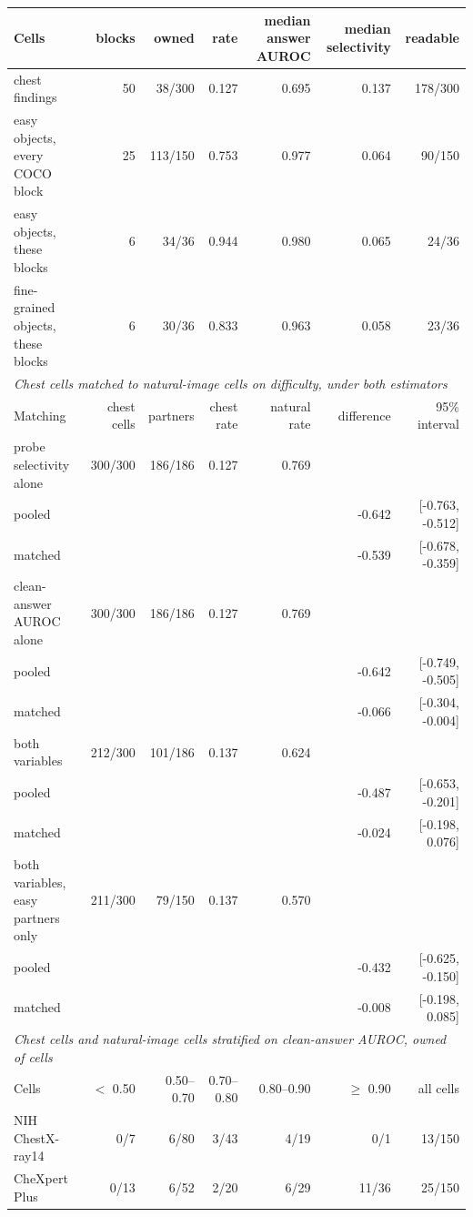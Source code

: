 \documentclass{article}
\begin{document}
\begin{table}[htbp]
\begin{tabular}{lrrrrrr}
Cells & blocks & owned & rate & median answer AUROC & median selectivity & readable \\
\midrule
chest findings & 50 & 38/300 & 0.127 & 0.695 & 0.137 & 178/300 \\
easy objects, every COCO block & 25 & 113/150 & 0.753 & 0.977 & 0.064 & 90/150 \\
easy objects, these blocks & 6 & 34/36 & 0.944 & 0.980 & 0.065 & 24/36 \\
fine-grained objects, these blocks & 6 & 30/36 & 0.833 & 0.963 & 0.058 & 23/36 \\
\midrule
\multicolumn{7}{l}{\textit{Chest cells matched to natural-image cells on difficulty, under both estimators}} \\
Matching & chest cells & partners & chest rate & natural rate & difference & 95\% interval \\
\midrule
probe selectivity alone & 300/300 & 186/186 & 0.127 & 0.769 &  &  \\
\quad pooled &  &  &  &  & -0.642 & [-0.763, -0.512] \\
\quad matched &  &  &  &  & -0.539 & [-0.678, -0.359] \\
clean-answer AUROC alone & 300/300 & 186/186 & 0.127 & 0.769 &  &  \\
\quad pooled &  &  &  &  & -0.642 & [-0.749, -0.505] \\
\quad matched &  &  &  &  & -0.066 & [-0.304, -0.004] \\
both variables & 212/300 & 101/186 & 0.137 & 0.624 &  &  \\
\quad pooled &  &  &  &  & -0.487 & [-0.653, -0.201] \\
\quad matched &  &  &  &  & -0.024 & [-0.198, 0.076] \\
both variables, easy partners only & 211/300 & 79/150 & 0.137 & 0.570 &  &  \\
\quad pooled &  &  &  &  & -0.432 & [-0.625, -0.150] \\
\quad matched &  &  &  &  & -0.008 & [-0.198, 0.085] \\
\midrule
\multicolumn{7}{l}{\textit{Chest cells and natural-image cells stratified on clean-answer AUROC, owned of cells}} \\
Cells & $<$ 0.50 & 0.50--0.70 & 0.70--0.80 & 0.80--0.90 & $\geq$ 0.90 & all cells \\
\midrule
NIH ChestX-ray14 & 0/7 & 6/80 & 3/43 & 4/19 & 0/1 & 13/150 \\
CheXpert Plus & 0/13 & 6/52 & 2/20 & 6/29 & 11/36 & 25/150 \\

\end{tabular}
\end{table}
\end{document}
